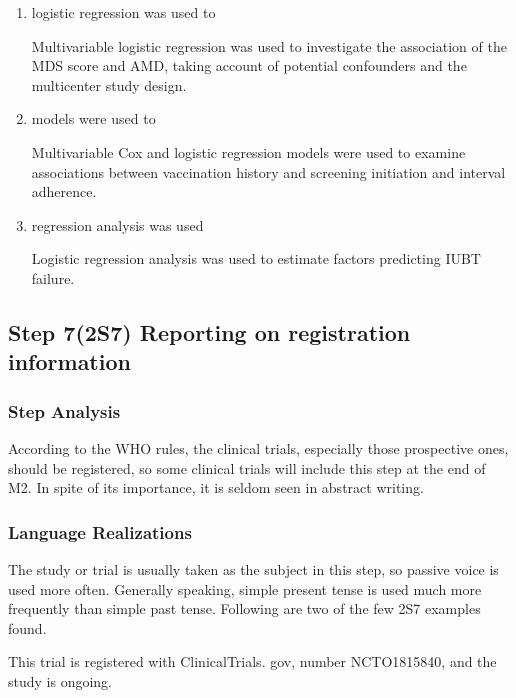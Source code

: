 \documentclass{ctexbook}
\begin{document}
    \begin{enumerate}
      \item logistic regression was used to
      \begin{eg}{}
        Multivariable logistic regression was used to investigate the association of the MDS score and AMD, taking account of potential confounders and the multicenter study design.   
      \end{eg}
      \item models were used to
      \begin{eg}{}
        Multivariable Cox and logistic regression models were used to examine associations between vaccination history and screening initiation and interval adherence. 
      \end{eg}
      \item regression analysis was used
      \begin{eg}{}
        Logistic regression analysis was used to estimate factors predicting IUBT failure.   
      \end{eg}
    \end{enumerate}

  \subsection{Step 7(2S7) Reporting on registration information}

    \subsubsection{Step Analysis}

    According to the WHO rules, the clinical trials, especially those prospective ones, should be registered, so some clinical trials will include this step at the end of M2. In spite of its importance, it is seldom seen in abstract writing.

    \subsubsection{Language Realizations}

    The study or trial is usually taken as the subject in this step, so passive voice is used more often. Generally speaking, simple present tense is used much more frequently than simple past tense. Following are two of the few 2S7 examples found.

    \begin{eg}{}
      This trial is registered with ClinicalTrials. gov, number NCTO1815840, and the study is ongoing.
    \end{eg}
\end{document}
